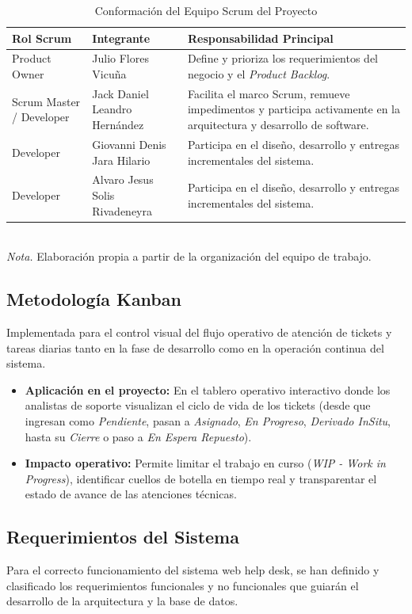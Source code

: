 \begin{table}[H]
\centering
\small
\renewcommand{\arraystretch}{1.2}
\caption{Conformación del Equipo Scrum del Proyecto}
\label{tab:equipo_scrum}
\begin{tabular}{@{} p{3.5cm} p{4.5cm} p{6.5cm} @{}}
\toprule
\textbf{Rol Scrum} & \textbf{Integrante} & \textbf{Responsabilidad Principal} \\
\midrule
Product Owner & Julio Flores Vicuña & Define y prioriza los requerimientos del negocio y el \textit{Product Backlog}. \\
Scrum Master / Developer & Jack Daniel Leandro Hernández & Facilita el marco Scrum, remueve impedimentos y participa activamente en la arquitectura y desarrollo de software. \\
Developer & Giovanni Denis Jara Hilario & Participa en el diseño, desarrollo y entregas incrementales del sistema. \\
Developer & Alvaro Jesus Solis Rivadeneyra & Participa en el diseño, desarrollo y entregas incrementales del sistema. \\
\bottomrule
\end{tabular}
\\[0.3em]
{\small \textit{Nota.} Elaboración propia a partir de la organización del equipo de trabajo.}
\end{table}

\subsection{Metodología Kanban}
Implementada para el control visual del flujo operativo de atención de tickets y tareas diarias tanto en la fase de desarrollo como en la operación continua del sistema.
\begin{itemize}
\item \textbf{Aplicación en el proyecto:} En el tablero operativo interactivo donde los analistas de soporte visualizan el ciclo de vida de los tickets (desde que ingresan como \textit{Pendiente}, pasan a \textit{Asignado}, \textit{En Progreso}, \textit{Derivado InSitu}, hasta su \textit{Cierre} o paso a \textit{En Espera Repuesto}).
\item \textbf{Impacto operativo:} Permite limitar el trabajo en curso (\textit{WIP - Work in Progress}), identificar cuellos de botella en tiempo real y transparentar el estado de avance de las atenciones técnicas.
\end{itemize}

\subsection{Requerimientos del Sistema}
Para el correcto funcionamiento del sistema web help desk, se han definido y clasificado los requerimientos funcionales y no funcionales que guiarán el desarrollo de la arquitectura y la base de datos.

